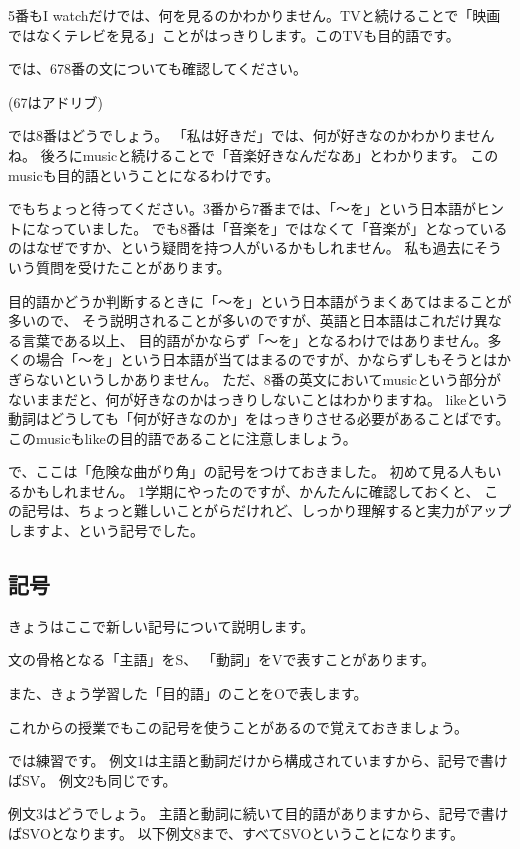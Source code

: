\documentclass[book,jafontscale=0.9247]{jlreq}
\begin{document}
5番もI watchだけでは、何を見るのかわかりません。TVと続けることで「映画ではなくテレビを見る」ことがはっきりします。このTVも目的語です。

では、678番の文についても確認してください。

(67はアドリブ)

では8番はどうでしょう。
「私は好きだ」では、何が好きなのかわかりませんね。
後ろにmusicと続けることで「音楽好きなんだなあ」とわかります。
このmusicも目的語ということになるわけです。

でもちょっと待ってください。3番から7番までは、「～を」という日本語がヒントになっていました。
でも8番は「音楽を」ではなくて「音楽が」となっているのはなぜですか、という疑問を持つ人がいるかもしれません。
私も過去にそういう質問を受けたことがあります。

目的語かどうか判断するときに「～を」という日本語がうまくあてはまることが多いので、
そう説明されることが多いのですが、英語と日本語はこれだけ異なる言葉である以上、
目的語がかならず「～を」となるわけではありません。多くの場合「～を」という日本語が当てはまるのですが、かならずしもそうとはかぎらないというしかありません。
ただ、8番の英文においてmusicという部分がないままだと、何が好きなのかはっきりしないことはわかりますね。
likeという動詞はどうしても「何が好きなのか」をはっきりさせる必要があることばです。
このmusicもlikeの目的語であることに注意しましょう。

で、ここは「危険な曲がり角」の記号\dbend{}をつけておきました。
初めて見る人もいるかもしれません。
1学期にやったのですが、かんたんに確認しておくと、
この記号は、ちょっと難しいことがらだけれど、しっかり理解すると実力がアップしますよ、という記号でした。

\subsection{記号}

きょうはここで新しい記号について説明します。

文の骨格となる「主語」をS、
「動詞」をVで表すことがあります。

また、きょう学習した「目的語」のことをOで表します。


これからの授業でもこの記号を使うことがあるので覚えておきましょう。

では練習です。
例文1は主語と動詞だけから構成されていますから、記号で書けばSV。
例文2も同じです。

例文3はどうでしょう。
主語と動詞に続いて目的語がありますから、記号で書けばSVOとなります。
以下例文8まで、すべてSVOということになります。
\end{document}
